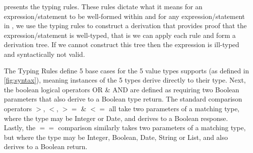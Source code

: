  presents the \thePolicyLang typing rules.
These rules dictate what it means for an expression/statement to be well-formed within \thePolicyLang and for any expression/statement in \thePolicyLang, we use the typing rules to construct a derivation that provides proof that the expression/statement is well-typed, that is we can apply each rule and form a derivation tree. If we cannot construct this tree then the expression is ill-typed and syntactically not valid.

The Typing Rules define 5 base cases for the 5 value types \thePolicyLang supports (as defined in \cref{fig:syntax}), meaning instances of the 5 types derive directly to their type. Next, the boolean logical operators OR \& AND are defined as requiring two Boolean parameters that also derive to a Boolean type return. The standard comparison operators \textbf{$>$}, \textbf{$<$}, \textbf{$>=$} \& \textbf{$<=$} all take two parameters of a matching type, where the type may be Integer or Date, and derives to a Boolean response. Lastly, the \textbf{$==$} comparison similarly takes two parameters of a matching type, but where the type may be Integer, Boolean, Date, String or List, and also derives to a Boolean return.
